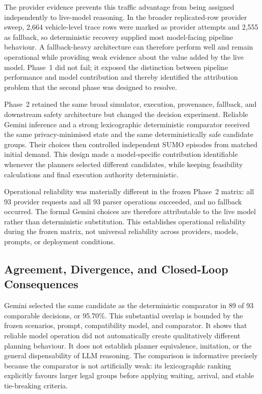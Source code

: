 \documentclass[letterpaper,10pt,conference]{ieeeconf}
\begin{document}
The provider evidence prevents this traffic advantage from being assigned independently to live-model reasoning. In the broader replicated-row provider sweep, 2,664 vehicle-level trace rows were marked as provider attempts and 2,555 as fallback, so deterministic recovery supplied most model-facing pipeline behaviour. A fallback-heavy architecture can therefore perform well and remain operational while providing weak evidence about the value added by the live model. Phase~1 did not fail; it exposed the distinction between pipeline performance and model contribution and thereby identified the attribution problem that the second phase was designed to resolve.



Phase~2 retained the same broad simulator, execution, provenance, fallback, and downstream safety architecture but changed the decision experiment. Reliable Gemini inference and a strong lexicographic deterministic comparator received the same privacy-minimised state and the same deterministically safe candidate groups. Their choices then controlled independent SUMO episodes from matched initial demand. This design made a model-specific contribution identifiable whenever the planners selected different candidates, while keeping feasibility calculations and final execution authority deterministic.



Operational reliability was materially different in the frozen Phase~2 matrix: all 93 provider requests and all 93 parser operations succeeded, and no fallback occurred. The formal Gemini choices are therefore attributable to the live model rather than deterministic substitution. This establishes operational reliability during the frozen matrix, not universal reliability across providers, models, prompts, or deployment conditions.



\subsection{Agreement, Divergence, and Closed-Loop Consequences}



Gemini selected the same candidate as the deterministic comparator in 89 of 93 comparable decisions, or 95.70\%. This substantial overlap is bounded by the frozen scenarios, prompt, compatibility model, and comparator. It shows that reliable model operation did not automatically create qualitatively different planning behaviour. It does not establish planner equivalence, imitation, or the general dispensability of LLM reasoning. The comparison is informative precisely because the comparator is not artificially weak: its lexicographic ranking explicitly favours larger legal groups before applying waiting, arrival, and stable tie-breaking criteria.
\end{document}
